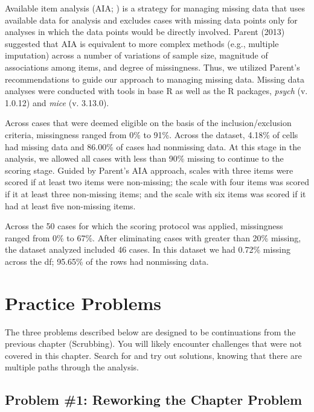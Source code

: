 \documentclass[
  11pt,
]{book}
\begin{document}
Available item analysis (AIA; \citep{parent_handling_2013}) is a strategy for managing missing data that uses available data for analysis and excludes cases with missing data points only for analyses in which the data points would be directly involved. Parent (2013) suggested that AIA is equivalent to more complex methods (e.g., multiple imputation) across a number of variations of sample size, magnitude of associations among items, and degree of missingness. Thus, we utilized Parent's recommendations to guide our approach to managing missing data. Missing data analyses were conducted with tools in base R as well as the R packages, \emph{psych} (v. 1.0.12) and \emph{mice} (v. 3.13.0).

Across cases that were deemed eligible on the basis of the inclusion/exclusion criteria, missingness ranged from 0\% to 91\%. Across the dataset, 4.18\% of cells had missing data and 86.00\% of cases had nonmissing data. At this stage in the analysis, we allowed all cases with less than 90\% missing to continue to the scoring stage. Guided by Parent's \citeyearpar{parent_handling_2013} AIA approach, scales with three items were scored if at least two items were non-missing; the scale with four items was scored if it at least three non-missing items; and the scale with six items was scored if it had at least five non-missing items.

Across the 50 cases for which the scoring protocol was applied, missingness ranged from 0\% to 67\%. After eliminating cases with greater than 20\% missing, the dataset analyzed included 46 cases. In this dataset we had 0.72\% missing across the df; 95.65\% of the rows had nonmissing data.

\hypertarget{practice-problems-1}{%
\section{Practice Problems}\label{practice-problems-1}}

The three problems described below are designed to be continuations from the previous chapter (Scrubbing). You will likely encounter challenges that were not covered in this chapter. Search for and try out solutions, knowing that there are multiple paths through the analysis.

\hypertarget{problem-1-reworking-the-chapter-problem}{%
\subsection{Problem \#1: Reworking the Chapter Problem}\label{problem-1-reworking-the-chapter-problem}}
\end{document}
